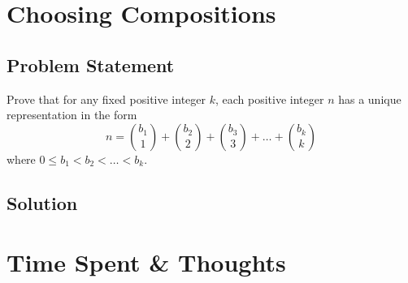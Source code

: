 \documentclass[12pt]{article}
\newcommand{\ProblemStatement}[1]{
\subsection*{Problem Statement}
#1
\subsection*{Solution}
}
\begin{document}
\section{Choosing Compositions}
\ProblemStatement{
Prove that for any fixed positive integer $k$, each positive integer $n$ has a unique representation in the form 
\[
    n = \binom{b_1}{1} + \binom{b_2}{2} + \binom{b_3}{3} +\dots + \binom{b_k}{k} 
\]
where $0 \le b_1 < b_2 < \dots < b_k$.
}



\section{Time Spent \& Thoughts}
\end{document}
